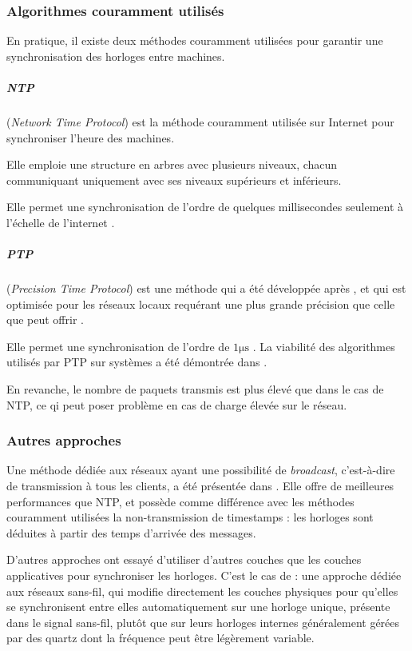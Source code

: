 \subsubsection{Algorithmes couramment utilisés}
En pratique, il existe deux méthodes couramment utilisées pour garantir une synchronisation des horloges entre machines.

\subparagraph{NTP} (\textit{Network Time Protocol}) est la méthode couramment utilisée sur Internet pour synchroniser l'heure des machines.

Elle emploie une structure en arbres avec plusieurs niveaux, chacun communiquant uniquement avec ses niveaux supérieurs et inférieurs.

Elle permet une synchronisation de l'ordre de quelques millisecondes seulement à l'échelle de l'internet \cite{mills1991internet}.
\subparagraph{PTP} (\textit{Precision Time Protocol}) est une méthode qui a été développée après , et qui est optimisée pour les réseaux locaux requérant une plus grande précision que celle que peut offrir .

Elle permet une synchronisation de l'ordre de $\num{1}\si{\micro\second}$ \cite{peng2009research, scheiterer2009synchronization}. La viabilité des algorithmes utilisés par \ac{PTP} sur systèmes  a été démontrée dans \cite{hsu2012measurement}.

En revanche, le nombre de paquets transmis est plus élevé que dans le cas de \ac{NTP}, ce qi peut poser problème en cas de charge élevée sur le réseau.
\subsubsection{Autres approches}
Une méthode dédiée aux réseaux ayant une possibilité de \textit{broadcast}, c'est-à-dire de transmission à tous les clients, a été présentée dans \cite{elson2002fine}. Elle offre de meilleures performances que \ac{NTP}, et possède comme différence avec les méthodes couramment utilisées la non-transmission de timestamps : les horloges sont déduites à partir des temps d'arrivée des messages.

D'autres approches ont essayé d'utiliser d'autres couches que les couches applicatives pour synchroniser les horloges. C'est le cas de \cite{abari2014one} : une approche dédiée aux réseaux sans-fil, qui modifie directement les couches physiques pour qu'elles se synchronisent entre elles automatiquement sur une horloge unique, présente dans le signal sans-fil, plutôt que sur leurs horloges internes généralement gérées par des quartz dont la fréquence peut être légèrement variable.

